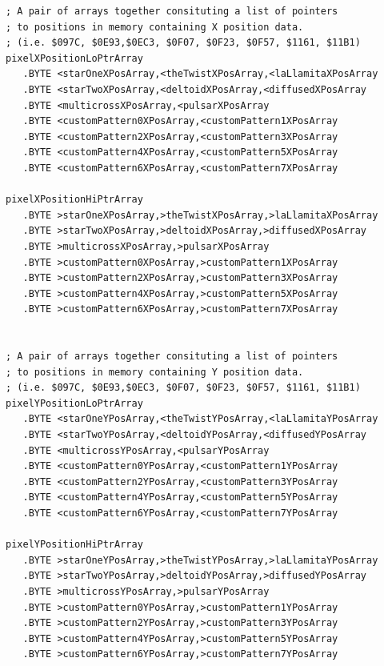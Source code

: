 \clearpage
\begin{lstlisting}[caption = All the pattern data structures in Psychedelia organized into a set of arrays. 
We use these arrays to choose the correct user-selected pattern at painting time.]
; A pair of arrays together consituting a list of pointers
; to positions in memory containing X position data.
; (i.e. $097C, $0E93,$0EC3, $0F07, $0F23, $0F57, $1161, $11B1)
pixelXPositionLoPtrArray
   .BYTE <starOneXPosArray,<theTwistXPosArray,<laLlamitaXPosArray
   .BYTE <starTwoXPosArray,<deltoidXPosArray,<diffusedXPosArray
   .BYTE <multicrossXPosArray,<pulsarXPosArray
   .BYTE <customPattern0XPosArray,<customPattern1XPosArray
   .BYTE <customPattern2XPosArray,<customPattern3XPosArray
   .BYTE <customPattern4XPosArray,<customPattern5XPosArray
   .BYTE <customPattern6XPosArray,<customPattern7XPosArray

pixelXPositionHiPtrArray 
   .BYTE >starOneXPosArray,>theTwistXPosArray,>laLlamitaXPosArray
   .BYTE >starTwoXPosArray,>deltoidXPosArray,>diffusedXPosArray
   .BYTE >multicrossXPosArray,>pulsarXPosArray
   .BYTE >customPattern0XPosArray,>customPattern1XPosArray
   .BYTE >customPattern2XPosArray,>customPattern3XPosArray
   .BYTE >customPattern4XPosArray,>customPattern5XPosArray
   .BYTE >customPattern6XPosArray,>customPattern7XPosArray


; A pair of arrays together consituting a list of pointers
; to positions in memory containing Y position data.
; (i.e. $097C, $0E93,$0EC3, $0F07, $0F23, $0F57, $1161, $11B1)
pixelYPositionLoPtrArray 
   .BYTE <starOneYPosArray,<theTwistYPosArray,<laLlamitaYPosArray
   .BYTE <starTwoYPosArray,<deltoidYPosArray,<diffusedYPosArray
   .BYTE <multicrossYPosArray,<pulsarYPosArray
   .BYTE <customPattern0YPosArray,<customPattern1YPosArray
   .BYTE <customPattern2YPosArray,<customPattern3YPosArray
   .BYTE <customPattern4YPosArray,<customPattern5YPosArray
   .BYTE <customPattern6YPosArray,<customPattern7YPosArray

pixelYPositionHiPtrArray 
   .BYTE >starOneYPosArray,>theTwistYPosArray,>laLlamitaYPosArray
   .BYTE >starTwoYPosArray,>deltoidYPosArray,>diffusedYPosArray
   .BYTE >multicrossYPosArray,>pulsarYPosArray
   .BYTE >customPattern0YPosArray,>customPattern1YPosArray
   .BYTE >customPattern2YPosArray,>customPattern3YPosArray
   .BYTE >customPattern4YPosArray,>customPattern5YPosArray
   .BYTE >customPattern6YPosArray,>customPattern7YPosArray

\end{lstlisting}
\clearpage

